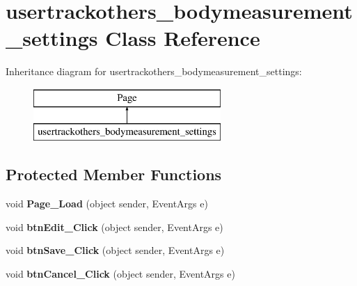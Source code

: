 \hypertarget{classusertrackothers__bodymeasurement__settings}{\section{usertrackothers\-\_\-bodymeasurement\-\_\-settings Class Reference}
\label{classusertrackothers__bodymeasurement__settings}
}
Inheritance diagram for usertrackothers\-\_\-bodymeasurement\-\_\-settings\-:\begin{figure}[H]
\begin{center}
\leavevmode
\includegraphics[height=2.000000cm]{classusertrackothers__bodymeasurement__settings}
\end{center}
\end{figure}
\subsection*{Protected Member Functions}
\begin{DoxyCompactItemize}
\item 
\hypertarget{classusertrackothers__bodymeasurement__settings_a0d69330fd86c685da102d3a5ec167e17}{void {\bfseries Page\-\_\-\-Load} (object sender, Event\-Args e)}\label{classusertrackothers__bodymeasurement__settings_a0d69330fd86c685da102d3a5ec167e17}

\item 
\hypertarget{classusertrackothers__bodymeasurement__settings_a99c2feb0389f3493bf95fd811e572973}{void {\bfseries btn\-Edit\-\_\-\-Click} (object sender, Event\-Args e)}\label{classusertrackothers__bodymeasurement__settings_a99c2feb0389f3493bf95fd811e572973}

\item 
\hypertarget{classusertrackothers__bodymeasurement__settings_a62d8a26127731b49193b354913a47117}{void {\bfseries btn\-Save\-\_\-\-Click} (object sender, Event\-Args e)}\label{classusertrackothers__bodymeasurement__settings_a62d8a26127731b49193b354913a47117}

\item 
\hypertarget{classusertrackothers__bodymeasurement__settings_ae293bf0015fd6bffde9bcb9976a5fadf}{void {\bfseries btn\-Cancel\-\_\-\-Click} (object sender, Event\-Args e)}\label{classusertrackothers__bodymeasurement__settings_ae293bf0015fd6bffde9bcb9976a5fadf}

\end{DoxyCompactItemize}


